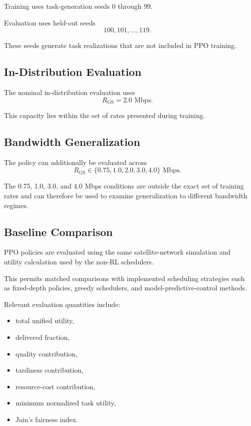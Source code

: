 \documentclass[11pt]{article}
\begin{document}
Training uses task-generation seeds 0 through 99.

Evaluation uses held-out seeds
\[
100,101,\ldots,119.
\]

These seeds generate task realizations that are not included in PPO training.


\subsection{In-Distribution Evaluation}

The nominal in-distribution evaluation uses
\[
R_{\mathrm{GS}}=2.0\text{ Mbps}.
\]

This capacity lies within the set of rates presented during training.


\subsection{Bandwidth Generalization}

The policy can additionally be evaluated across
\[
R_{\mathrm{GS}}
\in
\{0.75,1.0,2.0,3.0,4.0\}
\text{ Mbps}.
\]

The 0.75, 1.0, 3.0, and 4.0 Mbps conditions are outside the exact set of
training rates and can therefore be used to examine generalization to
different bandwidth regimes.


\subsection{Baseline Comparison}

PPO policies are evaluated using the same satellite-network simulation and
utility calculation used by the non-RL schedulers.

This permits matched comparisons with implemented scheduling strategies such
as fixed-depth policies, greedy schedulers, and model-predictive-control
methods.

Relevant evaluation quantities include:
\begin{itemize}
    \item total unified utility,
    \item delivered fraction,
    \item quality contribution,
    \item tardiness contribution,
    \item resource-cost contribution,
    \item minimum normalized task utility,
    \item Jain's fairness index.
\end{itemize}
\end{document}
